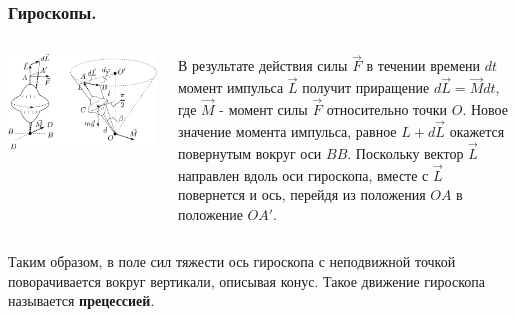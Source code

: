 \documentclass{beamer}
\begin{document}
\begin{frame}[r]
\frametitle{Гироскопы.}
\begin{columns}[t]
\begin{column}{0.5\linewidth}
\begin{block}{}
\includegraphics[width=1\columnwidth]{gyro2}
\end{block}
\end{column}
\begin{column}{0.45\linewidth}
\small{ В результате действия силы $\vec{F}$ в течении времени $dt$ момент импульса $\vec{L}$ получит приращение $d\vec{L} = \vec{M} dt$, где $\vec{M}$ - момент силы $\vec{F}$ относительно точки $O$. Новое значение момента импульса, равное $L + d\vec{L}$ окажется повернутым вокруг оси $BB$. Поскольку вектор $\vec{L}$ направлен вдоль оси гироскопа, вместе с $\vec{L}$ повернется и ось, перейдя из положения $OA$ в положение $OA'$. }
\end{column}
\end{columns}
\medskip
\small{Таким образом, в поле сил тяжести ось гироскопа с неподвижной точкой поворачивается вокруг вертикали, описывая конус. Такое движение гироскопа называется \textbf{прецессией}.}
\end{frame}

\end{document}
